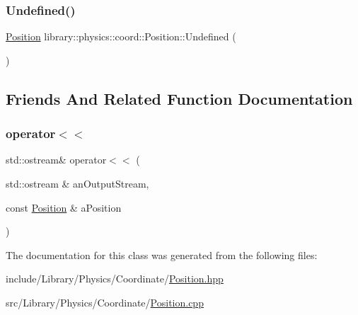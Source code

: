 \mbox{\label{classlibrary_1_1physics_1_1coord_1_1_position_a65f80401df5fa5c1eab7e3bdf1b8f8c5}} 
\subsubsection{\texorpdfstring{Undefined()}{Undefined()}}
{\footnotesize\ttfamily \hyperlink{classlibrary_1_1physics_1_1coord_1_1_position}{Position} library\+::physics\+::coord\+::\+Position\+::\+Undefined (\begin{DoxyParamCaption}{ }\end{DoxyParamCaption})\hspace{0.3cm}{\ttfamily [static]}}



\subsection{Friends And Related Function Documentation}
\mbox{\label{classlibrary_1_1physics_1_1coord_1_1_position_aab9f362c268370239ccad2c8a6d0eaee}} 
\subsubsection{\texorpdfstring{operator$<$$<$}{operator<<}}
{\footnotesize\ttfamily std\+::ostream\& operator$<$$<$ (\begin{DoxyParamCaption}\item[{std\+::ostream \&}]{an\+Output\+Stream,  }\item[{const \hyperlink{classlibrary_1_1physics_1_1coord_1_1_position}{Position} \&}]{a\+Position }\end{DoxyParamCaption})\hspace{0.3cm}{\ttfamily [friend]}}



The documentation for this class was generated from the following files\+:\begin{DoxyCompactItemize}
\item 
include/\+Library/\+Physics/\+Coordinate/\hyperlink{_position_8hpp}{Position.\+hpp}\item 
src/\+Library/\+Physics/\+Coordinate/\hyperlink{_position_8cpp}{Position.\+cpp}\end{DoxyCompactItemize}
